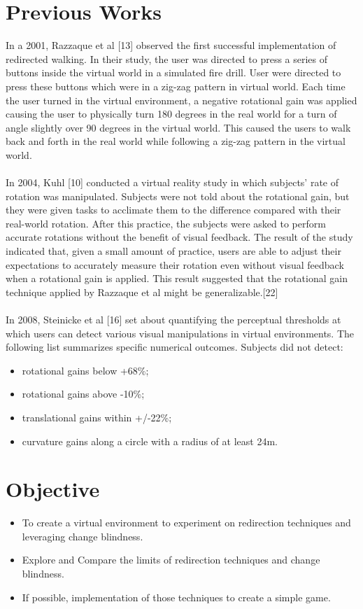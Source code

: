 \documentclass[12pt]{article}
\begin{document}
\section{Previous Works}
In a 2001, Razzaque et al [13] observed the first successful implementation of redirected walking. In their study, the user was directed to press a series of buttons inside the virtual world in a simulated fire drill. User were directed to press these buttons which were in a zig-zag pattern in virtual world. Each time the user turned in the virtual environment, a negative rotational gain was applied causing the user to physically turn 180 degrees in the real world for a turn of angle slightly over 90 degrees in the virtual world. This caused the users to walk back and forth in the real world while following a zig-zag pattern in the virtual world.\\
\\
In 2004, Kuhl [10] conducted a virtual reality study in which subjects' rate of rotation was manipulated. Subjects were not told about the rotational gain, but they were given tasks to acclimate them to the difference compared with their real-world rotation. After this practice, the subjects were asked to perform accurate rotations without the benefit of visual feedback. The result of the study indicated that, given a small amount of practice, users are able to adjust their expectations to accurately measure their rotation even without visual feedback when a rotational gain is applied. This result suggested that the rotational gain technique applied by Razzaque et al might be generalizable.[22]\\
\\
In 2008, Steinicke et al [16] set about quantifying the perceptual thresholds at which users can detect various visual manipulations in virtual environments.
The following list summarizes specific numerical outcomes. Subjects did not detect:
	
\begin{itemize}
\item rotational gains below +68\%;
\item	rotational gains above -10\%;
\item	translational gains within +/-22\%;
\item	curvature gains along a circle with a radius of at least 24m.

\end{itemize}
\clearpage
\section{Objective}
\begin{itemize}
\item To create a virtual environment to experiment on redirection techniques and leveraging change blindness.
\item Explore and Compare the limits of redirection techniques and change blindness.
\item If possible, implementation of those techniques to create a simple game.
\end{itemize}
\end{document}
